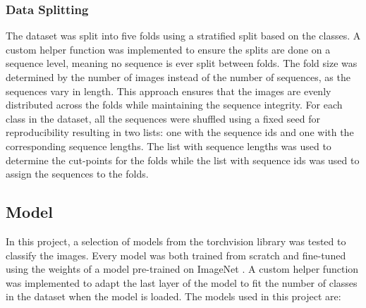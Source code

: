         \subsubsection{Data Splitting}
        The dataset was split into five folds using a stratified split based on the classes.
        A custom helper function was implemented to ensure the splits are done on a sequence level, meaning no sequence is ever split between folds.
        The fold size was determined by the number of images instead of the number of sequences, as the sequences vary in length.
        This approach ensures that the images are evenly distributed across the folds while maintaining the sequence integrity.
        For each class in the dataset, all the sequences were shuffled using a fixed seed for reproducibility resulting in two lists: one with the sequence ids and one with the corresponding sequence lengths.
        The list with sequence lengths was used to determine the cut-points for the folds while the list with sequence ids was used to assign the sequences to the folds.


    \subsection{Model}

    In this project, a selection of models from the torchvision library was tested to classify the images. 
    Every model was both trained from scratch and fine-tuned using the weights of a model pre-trained on ImageNet \autocite{dengImageNetLargescaleHierarchical2009}.
    A custom helper function was implemented to adapt the last layer of the model to fit the number of classes in the dataset when the model is loaded.
    The models used in this project are:

